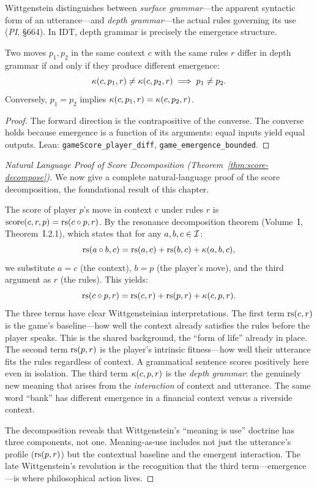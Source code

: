 Wittgenstein distinguishes between \emph{surface grammar}---the apparent
syntactic form of an utterance---and \emph{depth grammar}---the actual rules
governing its use (\textit{PI}, \S664). In IDT, depth grammar is precisely the
emergence structure.

\begin{theorem}
\label{thm:depth-grammar}
Two moves $p_1, p_2$ in the same context $c$ with the same rules $r$ differ in
depth grammar if and only if they produce different emergence:
\[
\kappa(c, p_1, r) \neq \kappa(c, p_2, r) \implies p_1 \neq p_2.
\]
Conversely, $p_1 = p_2$ implies $\kappa(c, p_1, r) = \kappa(c, p_2, r)$.
\end{theorem}

\begin{proof}
The forward direction is the contrapositive of the converse. The converse
holds because emergence is a function of its arguments: equal inputs yield
equal outputs.
Lean: \texttt{gameScore\_player\_diff}, \texttt{game\_emergence\_bounded}.
\end{proof}

\begin{proof}[Natural Language Proof of Score Decomposition (Theorem~\ref{thm:score-decompose})]
We now give a complete natural-language proof of the score decomposition, the
foundational result of this chapter.

The score of player $p$'s move in context $c$ under rules $r$ is
$\mathrm{score}(c, r, p) = \mathrm{rs}(c \circ p, r)$. By the resonance
decomposition theorem (Volume~I, Theorem~I.2.1), which states that for any
$a, b, c \in \mathcal{I}$:
\[
\mathrm{rs}(a \circ b, c) = \mathrm{rs}(a, c) + \mathrm{rs}(b, c) + \kappa(a, b, c),
\]
we substitute $a = c$ (the context), $b = p$ (the player's move), and
the third argument as $r$ (the rules). This yields:
\[
\mathrm{rs}(c \circ p, r) = \mathrm{rs}(c, r) + \mathrm{rs}(p, r) + \kappa(c, p, r).
\]
The three terms have clear Wittgensteinian interpretations. The first term
$\mathrm{rs}(c, r)$ is the game's baseline---how well the context already satisfies
the rules before the player speaks. This is the shared background, the
``form of life'' already in place. The second term $\mathrm{rs}(p, r)$ is the
player's intrinsic fitness---how well their utterance fits the rules
regardless of context. A grammatical sentence scores positively here even
in isolation. The third term $\kappa(c, p, r)$ is the \emph{depth grammar}:
the genuinely new meaning that arises from the \emph{interaction} of context
and utterance. The same word ``bank'' has different emergence in a financial
context versus a riverside context.

The decomposition reveals that Wittgenstein's ``meaning is use'' doctrine
has three components, not one. Meaning-as-use includes not just the
utterance's profile ($\mathrm{rs}(p, r)$) but the contextual baseline and the
emergent interaction. The late Wittgenstein's revolution is the recognition
that the third term---emergence---is where philosophical action lives.
\end{proof}

